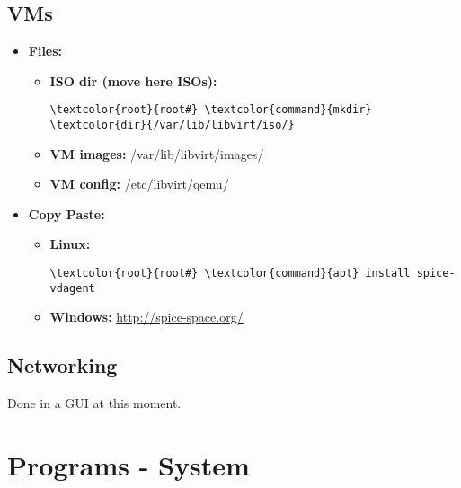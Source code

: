 \documentclass[10pt, a4paper, onecolumn, openany]{book} %
\begin{document}
\section{VMs}
\begin{itemize}
    \item \textbf{Files:}
    \begin{itemize}
        \item \textbf{ISO dir (move here ISOs):}
        \begin{Verbatim}[commandchars=\\\{\}]
\textcolor{root}{root#} \textcolor{command}{mkdir} \textcolor{dir}{/var/lib/libvirt/iso/}
        \end{Verbatim}
        \item \textbf{VM images:} 
        \newline \textcolor{dir}{/var/lib/libvirt/images/}
        \item \textbf{VM config:}
        \newline \textcolor{dir}{/etc/libvirt/qemu/}
    \end{itemize}
    \item \textbf{Copy Paste:}
        \begin{itemize}
            \item \textbf{Linux:}
            \begin{Verbatim}[commandchars=\\\{\}]
\textcolor{root}{root#} \textcolor{command}{apt} install spice-vdagent
        \end{Verbatim}
            \item \textbf{Windows:}
            \newline \underline{\url{http://spice-space.org/}}
        \end{itemize}
\end{itemize}
\section{Networking}
Done in a GUI at this moment.
\chapter{Programs - System}
\end{document}
